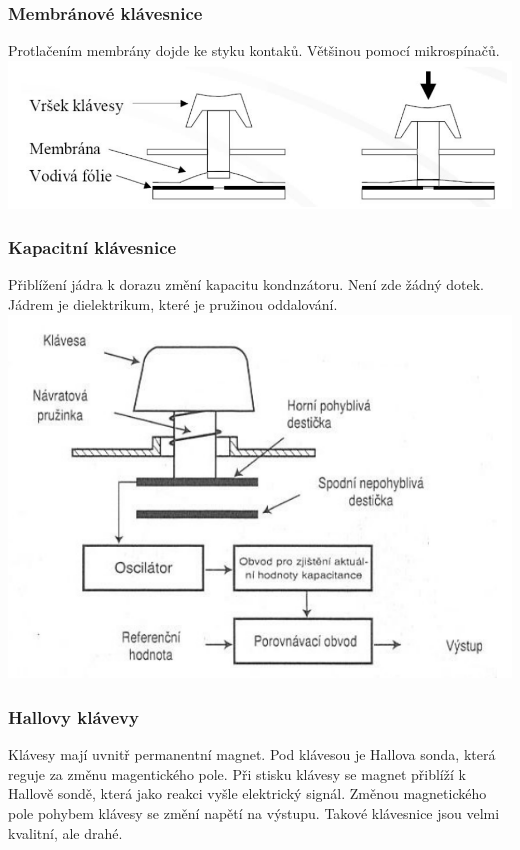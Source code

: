 \subsubsection{Membránové klávesnice}
Protlačením membrány dojde ke styku kontaků. Většinou pomocí mikrospínačů.\\
\includegraphics[width=1\linewidth]{TVY-POS/Vstupni-zarizeni/membranekey.png}
\subsubsection{Kapacitní klávesnice}
Přiblížení jádra k dorazu změní kapacitu kondnzátoru.
Není zde žádný dotek.
Jádrem je dielektrikum, které je pružinou oddalování.\\
\includegraphics[width=1\linewidth]{TVY-POS/Vstupni-zarizeni/capacitorkey.png}
\subsubsection{Hallovy klávevy}
Klávesy mají uvnitř permanentní magnet.
Pod klávesou je Hallova sonda, která reguje za změnu magentického pole.
Při stisku klávesy se magnet přiblíží k Hallově sondě, která jako reakci vyšle elektrický signál.
Změnou magnetického pole pohybem klávesy se změní napětí na výstupu.
Takové klávesnice jsou velmi kvalitní, ale drahé.
